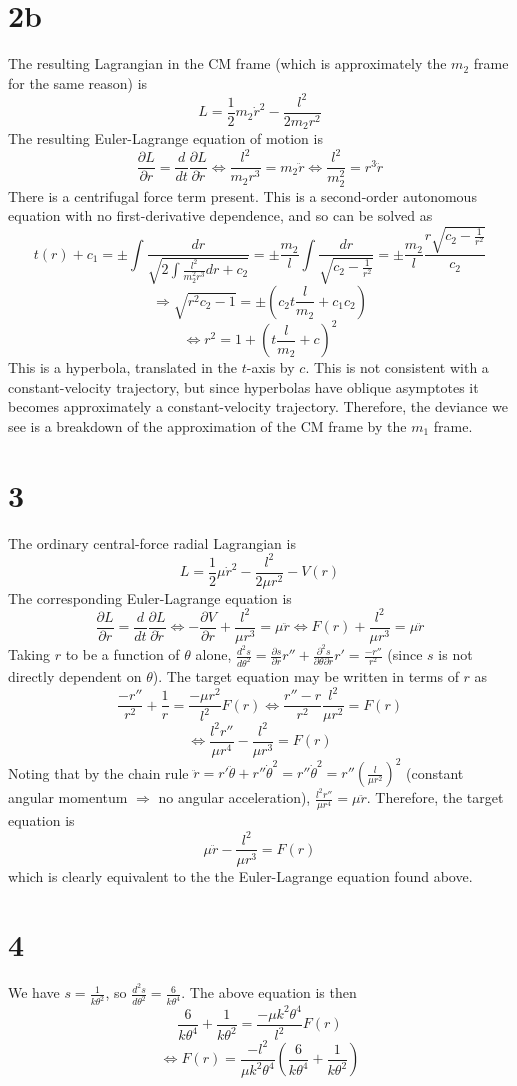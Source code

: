 \documentclass{article}
\begin{document}
\section*{2b}
The resulting Lagrangian in the CM frame (which is approximately the $m_2$ frame for the same reason) is
\[L=\frac{1}{2}m_2\dot{r}^2-\frac{l^2}{2m_2 r^2}\]
The resulting Euler-Lagrange equation of motion is
\[\frac{\partial L}{\partial r}=\frac{d}{dt}\frac{\partial L}{\partial \dot{r}}\Leftrightarrow \frac{l^2}{m_2 r^3}=m_2\ddot{r}\Leftrightarrow \frac{l^2}{m_2^2}=r^3\ddot{r}\]
There is a centrifugal force term present.
This is a second-order autonomous equation with no first-derivative dependence, and so can be solved as
\[t(r)+c_1=\pm\int\frac{dr}{\sqrt{2\int\frac{l^2}{m_2^2 r^3}dr+c_2}}=\pm{\frac{m_2}{l}}\int\frac{dr}{\sqrt{c_2-\frac{1}{r^2}}}=\pm{\frac{m_2}{l}}\frac{r\sqrt{c_2-\frac{1}{r^2}}}{c_2}\]
\[\Rightarrow \sqrt{r^2c_2-{1}}=\pm\left(c_2t{\frac{l}{m_2}}+c_1c_2\right)\]
\[\Leftrightarrow r^2={1+\left( t{\frac{l}{m_2}}+c \right)^2}\]
This is a hyperbola, translated in the $t$-axis by $c$. This is not consistent with a constant-velocity trajectory, but since hyperbolas have oblique asymptotes it becomes approximately a constant-velocity trajectory. Therefore, the deviance we see is a breakdown of the approximation of the CM frame by the $m_1$ frame.

\section*{3}
The ordinary central-force radial Lagrangian is
\[L=\frac{1}{2}\mu\dot{r}^2-\frac{l^2}{2\mu r^2}-V(r)\]
The corresponding Euler-Lagrange equation is
\[\frac{\partial L}{\partial r}=\frac{d}{dt}\frac{\partial L}{\partial \dot{r}}\Leftrightarrow -\frac{\partial V}{\partial r}+\frac{l^2}{\mu r^3}=\mu\ddot{r}\Leftrightarrow F(r)+\frac{l^2}{\mu r^3}=\mu\ddot{r}\]
Taking $r$ to be a function of $\theta$ alone, $\frac{d^2s}{d\theta^2}=\frac{\partial s}{\partial r}r''+\frac{\partial^2s}{\partial\theta\partial r}r'=\frac{-r''}{r^2}$ (since $s$ is not directly dependent on $\theta$). The target equation may be written in terms of $r$ as
\[\frac{-r''}{r^2}+\frac{1}{r}=\frac{-\mu r^2}{l^2}F(r)\Leftrightarrow \frac{r''-r}{r^2}\frac{l^2}{\mu r^2}=F(r)
\]\[\Leftrightarrow \frac{l^2r''}{\mu r^4}-\frac{l^2}{\mu r^3}=F(r)\]
Noting that by the chain rule $\ddot{r}=r'\ddot{\theta}+r''\dot{\theta}^2=r''\dot{\theta}^2=r''\left(\frac{l}{\mu r^2}\right)^2$ (constant angular momentum $\Rightarrow$ no angular acceleration), $\frac{l^2r''}{\mu r^4}=\mu \ddot{r}$. Therefore, the target equation is
\[\mu\ddot{r}-\frac{l^2}{\mu r^3}=F(r)\]
which is clearly equivalent to the the Euler-Lagrange equation found above. 

\section*{4}
We have $s=\frac{1}{k\theta^2}$, so $\frac{d^2s}{d\theta^2}=\frac{6}{k\theta^4}$. The above equation is then
\[\frac{6}{k\theta^4}+\frac{1}{k\theta^2}=\frac{-\mu k^2\theta^4}{l^2}F(r)\]
\[\Leftrightarrow F(r)=\frac{-l^2}{\mu k^2\theta^4}\left(\frac{6}{k\theta^4}+\frac{1}{k\theta^2}\right)\]
\end{document}
